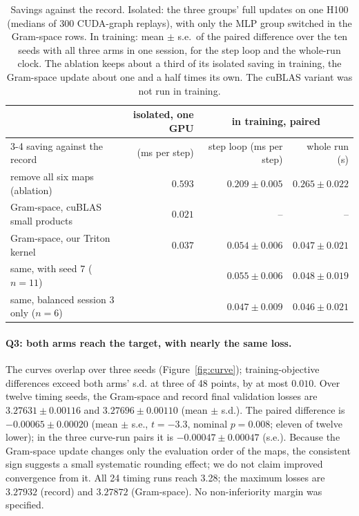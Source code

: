 \documentclass{article}
\begin{document}
\begin{table}[!htbp]\centering\small
\begin{tabular}{lrrr}\toprule
 & isolated, one GPU & \multicolumn{2}{c}{in training, paired}\\\cmidrule(lr){3-4}
saving against the record & (ms per step) & step loop (ms per step) & whole run (s)\\\midrule
remove all six maps (ablation) & $0.593$ & $0.209\pm0.005$ & $0.265\pm0.022$\\
Gram-space, cuBLAS small products & $0.021$ & -- & --\\
Gram-space, our Triton kernel & $0.037$ & $0.054\pm0.006$ & $0.047\pm0.021$\\
\quad same, with seed 7 ($n=11$) & & $0.055\pm0.006$ & $0.048\pm0.019$\\
\quad same, balanced session 3 only ($n=6$) & & $0.047\pm0.009$ & $0.046\pm0.021$\\\bottomrule
\end{tabular}
\caption{Savings against the record. Isolated: the three groups' full updates on one H100 (medians of 300 CUDA-graph replays), with only the MLP group switched in the Gram-space rows. In training: mean $\pm$ s.e.\ of the paired difference over the ten seeds with all three arms in one session, for the step loop and the whole-run clock. The ablation keeps about a third of its isolated saving in training, the Gram-space update about one and a half times its own. The cuBLAS variant was not run in training.}\label{tab:paired}
\end{table}



\paragraph{Q3: both arms reach the target, with nearly the same loss.} The curves overlap over three seeds (Figure~\ref{fig:curve}); training-objective differences exceed both arms' s.d. at three of 48 points, by at most $0.010$. Over twelve timing seeds, the Gram-space and record final validation losses are $3.27631\pm0.00116$ and $3.27696\pm0.00110$ (mean $\pm$ s.d.). The paired difference is $-0.00065\pm0.00020$ (mean $\pm$ s.e., $t=-3.3$, nominal $p=0.008$; eleven of twelve lower); in the three curve-run pairs it is $-0.00047\pm0.00047$ (s.e.). Because the Gram-space update changes only the evaluation order of the maps, the consistent sign suggests a small systematic rounding effect; we do not claim improved convergence from it. All 24 timing runs reach 3.28; the maximum losses are $3.27932$ (record) and $3.27872$ (Gram-space). No non-inferiority margin was specified.
\end{document}
